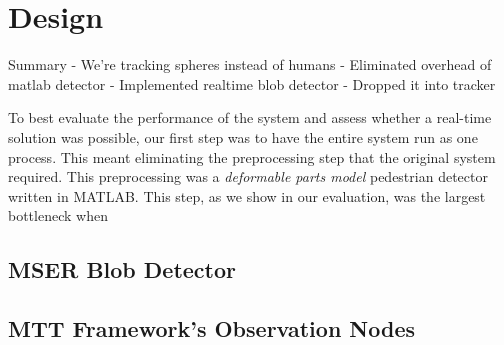 \section{Design}
\label{sec:design}

Summary
- We're tracking spheres instead of humans
- Eliminated overhead of matlab detector
- Implemented realtime blob detector
- Dropped it into tracker

To best evaluate the performance of the system and assess whether a real-time solution was possible, our first step was to have
the entire system run as one process. This meant eliminating the preprocessing step that the original system required. This
preprocessing was a \emph{deformable parts model} pedestrian detector written in MATLAB. This step, as we show in our
evaluation, was the largest bottleneck when 

\subsection{MSER Blob Detector}

\subsection{MTT Framework's Observation Nodes}
